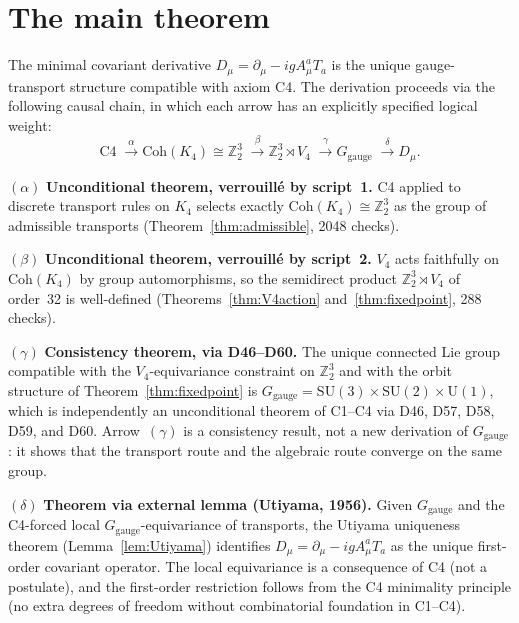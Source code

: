 \documentclass[11pt,a4paper]{article}
\newenvironment{theorembox}[1][]{%
  \begin{tcolorbox}[theoremstyle,title={Theorem%
    \ifx\relax#1\relax\else: #1\fi}]}{\end{tcolorbox}}
\theoremstyle{plain}
\theoremstyle{definition}
\theoremstyle{remark}
\newcommand{\Kfour}{K_4}
\newcommand{\Vfour}{V_4}
\newcommand{\Uone}{\mathrm{U}(1)}
\newcommand{\SUtwo}{\mathrm{SU}(2)}
\newcommand{\SUthree}{\mathrm{SU}(3)}
\newcommand{\Ggauge}{G_{\mathrm{gauge}}}
\newcommand{\Coh}{\mathrm{Coh}(K_4)}
\newcommand{\Dmu}{D_\mu}
\begin{document}
\section{The main theorem}
\label{sec:maintheorem}

\begin{theorembox}[Gauge dynamics from C4]
\label{thm:main}
The minimal covariant derivative $\Dmu = \partial_\mu - igA_\mu^a T_a$ is the unique
gauge-transport structure compatible with axiom C4. The derivation proceeds via the
following causal chain, in which each arrow has an explicitly specified logical weight:
\begin{equation}
\mathrm{C4}
\;\xrightarrow{\;\alpha\;}
\Coh \cong \mathbb{Z}_2^3
\;\xrightarrow{\;\beta\;}
\mathbb{Z}_2^3 \rtimes \Vfour
\;\xrightarrow{\;\gamma\;}
\Ggauge
\;\xrightarrow{\;\delta\;}
\Dmu.
\label{eq:chain}
\end{equation}

\smallskip
\noindent$(\alpha)$ \textbf{Unconditional theorem, verrouillé by script~1.} C4 applied to
discrete transport rules on $\Kfour$ selects exactly $\Coh \cong \mathbb{Z}_2^3$ as the
group of admissible transports (Theorem~\ref{thm:admissible}, 2048 checks).

\smallskip
\noindent$(\beta)$ \textbf{Unconditional theorem, verrouillé by script~2.} $\Vfour$ acts
faithfully on $\Coh$ by group automorphisms, so the semidirect product
$\mathbb{Z}_2^3 \rtimes \Vfour$ of order~32 is well-defined
(Theorems~\ref{thm:V4action} and~\ref{thm:fixedpoint}, 288 checks).

\smallskip
\noindent$(\gamma)$ \textbf{Consistency theorem, via D46--D60.} The unique connected Lie
group compatible with the $\Vfour$-equivariance constraint on $\mathbb{Z}_2^3$ and
with the orbit structure of Theorem~\ref{thm:fixedpoint} is
$\Ggauge = \SUthree \times \SUtwo \times \Uone$, which is independently an
unconditional theorem of C1--C4 via D46, D57, D58, D59, and D60.
Arrow~$(\gamma)$ is a consistency result, not a new derivation of $\Ggauge$:
it shows that the transport route and the algebraic route converge on the same group.

\smallskip
\noindent$(\delta)$ \textbf{Theorem via external lemma (Utiyama, 1956).} Given $\Ggauge$
and the C4-forced local $\Ggauge$-equivariance of transports, the Utiyama uniqueness
theorem (Lemma~\ref{lem:Utiyama}) identifies $\Dmu = \partial_\mu - igA_\mu^a T_a$
as the unique first-order covariant operator. The local equivariance is a consequence
of C4 (not a postulate), and the first-order restriction follows from the C4 minimality
principle (no extra degrees of freedom without combinatorial foundation in C1--C4).
\end{theorembox}
\end{document}
